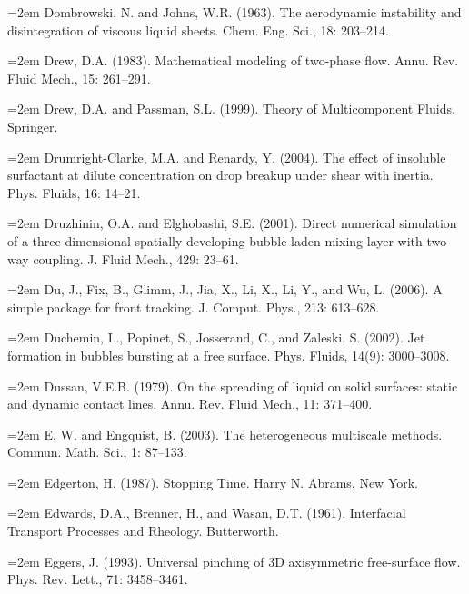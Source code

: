 \documentclass[11pt,a4paper,openany,fontset=none]{ctexbook}
\begin{document}

\par\hangindent=2em Dombrowski, N. and Johns, W.R. (1963). The aerodynamic instability and disintegration of viscous liquid sheets. Chem. Eng. Sci., 18: 203--214.

\par\hangindent=2em Drew, D.A. (1983). Mathematical modeling of two-phase flow. Annu. Rev. Fluid Mech., 15: 261--291.

\par\hangindent=2em Drew, D.A. and Passman, S.L. (1999). Theory of Multicomponent Fluids. Springer.

\par\hangindent=2em Drumright-Clarke, M.A. and Renardy, Y. (2004). The effect of insoluble surfactant at dilute concentration on drop breakup under shear with inertia. Phys. Fluids, 16: 14--21.

\par\hangindent=2em Druzhinin, O.A. and Elghobashi, S.E. (2001). Direct numerical simulation of a three-dimensional spatially-developing bubble-laden mixing layer with two-way coupling. J. Fluid Mech., 429: 23--61.

\par\hangindent=2em Du, J., Fix, B., Glimm, J., Jia, X., Li, X., Li, Y., and Wu, L. (2006). A simple package for front tracking. J. Comput. Phys., 213: 613--628.

\par\hangindent=2em Duchemin, L., Popinet, S., Josserand, C., and Zaleski, S. (2002). Jet formation in bubbles bursting at a free surface. Phys. Fluids, 14(9): 3000--3008.

\par\hangindent=2em Dussan, V.E.B. (1979). On the spreading of liquid on solid surfaces: static and dynamic contact lines. Annu. Rev. Fluid Mech., 11: 371--400.

\par\hangindent=2em E, W. and Engquist, B. (2003). The heterogeneous multiscale methods. Commun. Math. Sci., 1: 87--133.

\par\hangindent=2em Edgerton, H. (1987). Stopping Time. Harry N. Abrams, New York.

\par\hangindent=2em Edwards, D.A., Brenner, H., and Wasan, D.T. (1961). Interfacial Transport Processes and Rheology. Butterworth.

\par\hangindent=2em Eggers, J. (1993). Universal pinching of 3D axisymmetric free-surface flow. Phys. Rev. Lett., 71: 3458--3461.
\end{document}

